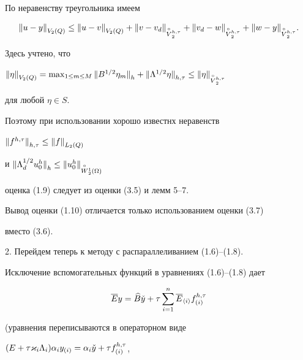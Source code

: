 \begin{pf} По неравенству треугольника имеем


$$


{\ver u-y\ver}_{V_2(Q)} \le {\ver u-v\ver}_{V_2(Q)}+


{\ver v-v_d\ver}_{\overset{\circ}{V}{}_2^{h,\tau}}+{


\ver v_d-w\ver}_{\overset{\circ}{V}{}_2^{h,\tau}}


+{\ver w-y\ver}_{\overset{\circ}{V}{}_2^{h,\tau}}.


$$


Здесь учтено, что 


${\ver \eta\ver}_{V_2(Q)}=\max_{1\le m\le M}


{\ver B^{1/2}\eta_m\ver}_h+{\ver\Lambda^{1/2}\eta\ver}_{h,\tau}\le


{\ver \eta\ver}_{\overset{\circ}{V}{}_2^{h,\tau}}$


для любой $\eta\in S$.


Поэтому при использовании хорошо известнх неравенств 


${\| f^{h,\tau}\|}_{h,\tau}\le {\|f\|}_{L_2(Q)}$ 


и ${\ver \Lambda_d^{1/2}u_0^h\ver}_{h}\le 


{\ver u_0^h\ver}_{\overset{\circ}{W}{}^1_ 2(\Omega)}$


оценка (1.9) следует из оценки (3.5) и лемм 5--7.





Вывод оценки (1.10) отличается только использованием оценки (3.7)


вместо (3.6).


\end{pf}





2. Перейдем теперь к методу с распараллеливанием (1.6)--(1.8). 


Исключение вспомогательных функций в уравнениях (1.6)--(1.8) дает


$$


\overline Ey=\bbb\Check y+\tau\sum_{i=1}^n


\overline E_{\langle i\rangle}f_{(i)}^{h,\tau}


$$


(уравнения переписываются в операторном виде


$(E+\tau\varkappa_i\Lambda_i)\alpha_iy_{(i)}=


\alpha_i\Check y+\tau f_{(i)}^{h,\tau}$, 


